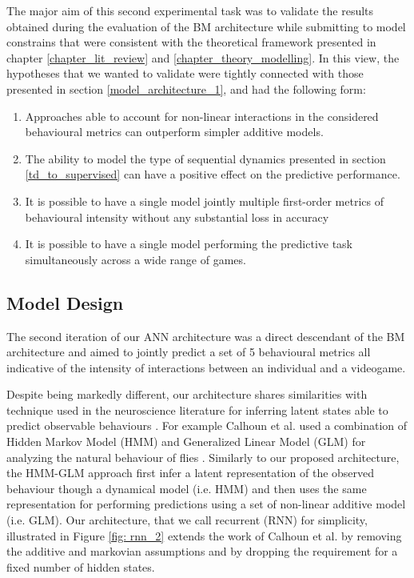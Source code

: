 The major aim of this second experimental task was to validate the results obtained during the evaluation of the BM architecture while submitting to model constrains that were consistent with the theoretical framework presented in chapter \ref{chapter_lit_review} and \ref{chapter_theory_modelling}. In this view, the hypotheses that we wanted to validate were tightly connected with those presented in section \ref{model_architecture_1}, and had the following form:
\begin{enumerate}
    \item Approaches able to account for non-linear interactions in the considered behavioural metrics can outperform simpler additive models.
    \item The ability to model the type of sequential dynamics presented in section \ref{td_to_supervised} can have a positive effect on the predictive performance.
    \item It is possible to have a single model jointly multiple first-order metrics of behavioural intensity without any substantial loss in accuracy
    \item It is possible to have a single model performing the predictive task simultaneously across a wide range of games.
\end{enumerate}

\subsection{Model Design}
\label{model_design_2}
The second iteration of our ANN architecture was a direct descendant of the BM architecture and aimed to jointly predict a set of 5 behavioural metrics all indicative of the intensity of interactions between an individual and a videogame. 

Despite being markedly different, our architecture shares similarities with technique used in the neuroscience literature for inferring latent states able to predict observable behaviours \cite{calhoun2019unsupervised}. For example Calhoun et al. used a combination of Hidden Markov Model (HMM) and Generalized Linear Model (GLM) for analyzing the natural behaviour of flies \cite{calhoun2019unsupervised}. Similarly to our proposed architecture, the HMM-GLM approach first infer a latent representation of the observed behaviour though a dynamical model (i.e. HMM) and then uses the same representation for performing predictions using a set of non-linear additive model (i.e. GLM). Our architecture, that we call recurrent (RNN) for simplicity, illustrated in Figure \ref{fig: rnn_2} extends the work of Calhoun et al. by removing the additive and markovian assumptions and by dropping the requirement for a fixed number of hidden states.

